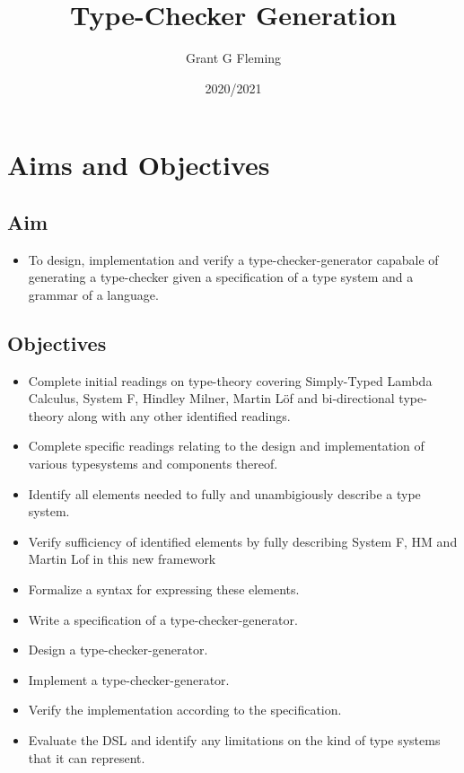 \documentclass{ProgressReport}[2020/09/15]
\title{Type-Checker Generation}
\author{Grant G Fleming}
\date{2020/2021}
\begin{document}
        \maketitle
	\tableofcontents
        
        \chapter{Aims and Objectives}

        \section{Aim}

        \begin{itemize}
          \item To design, implementation and verify a
            type-checker-generator capabale of generating a
            type-checker given a specification of a type system and a
            grammar of a language. 
        \end{itemize}
        
        \section{Objectives}

        \begin{itemize}
          \item Complete initial readings on type-theory covering
            Simply-Typed Lambda Calculus, System F, Hindley Milner,
            Martin L\"{o}f and bi-directional type-theory along with
            any other identified readings.
          \item Complete specific readings relating to the design and
            implementation of various typesystems and components thereof.
          \item Identify all elements needed to fully and
            unambigiously describe a type system.
          \item Verify sufficiency of identified elements by fully describing
            System F, HM and Martin Lof in this new framework
          \item Formalize a syntax for expressing these elements.
          \item Write a specification of a type-checker-generator.
          \item Design a type-checker-generator.
          \item Implement a type-checker-generator.
          \item Verify the implementation according to the
            specification.
          \item Evaluate the DSL and identify any limitations on the
            kind of type systems that it can represent.
        \end{itemize}
        
\end{document}
